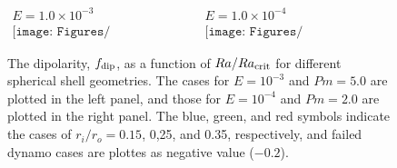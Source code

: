 \begin{figure}
\begin{center}
\[
\begin{array}{cc}
\mbox{$E = 1.0 \times 10^{-3}$} &
\mbox{$E = 1.0 \times 10^{-4}$} \\
\texttt{[image: Figures/fdip\_vs\_RacRatio\_Ek3.pdf]} &
\texttt{[image: Figures/fdip\_vs\_RacRatio\_Ek4.pdf]}
\end{array}
\]
\end{center}
\caption{The dipolarity, $f_{\rm dip}$, as a function of $Ra / Ra_{\rm crit}$ for different spherical shell geometries.
The cases for $E = 10^{-3}$ and $Pm = 5.0$ are plotted in the left panel, and those for $E = 10^{-4}$ and $Pm = 2.0$ are plotted in the right panel.
The blue, green, and red symbols indicate the cases of $r_{i} / r_{o} = 0.15$, 0,25, and 0.35, respectively, and failed dynamo cases are plottes as negative value ($-0.2$).
}
\label{fig:fdip_vs_Racratio}
\end{figure}